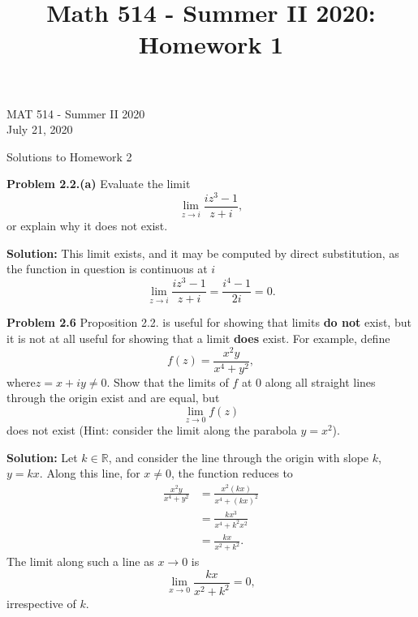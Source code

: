 \documentclass[12pt,oneside]{exam}
\title{Math 514 - Summer II 2020: Homework 1}
\newenvironment{exercise}[1]{\vspace{.1in}\noindent\textbf{Problem #1 \hspace{.05em}}}{}
\begin{document}
\begin{flushright}
\sc MAT 514 - Summer II 2020\\
July 21, 2020
\end{flushright}
\bigskip
 
\begin{center}
\textsf{Solutions to Homework 2} 
\end{center}


\begin{exercise}{2.2.(a)}
Evaluate the limit
\begin{equation*}
\lim_{z \to i} \frac{iz^3-1}{z+i},
\end{equation*}
or explain why it does not exist.
\end{exercise}

\vspace{0.5cm}

\noindent \textbf{Solution:} This limit exists, and it may be computed by direct substitution, as the function in question is continuous at $i$
\begin{equation*}
\lim_{z \to i} \frac{iz^3-1}{z+i} = \frac{i^4-1}{2i} = 0.
\end{equation*}

\vspace{1cm}

\begin{exercise}{2.6}
Proposition 2.2. is useful for showing that limits \textbf{do not} exist, but it is not at all useful for showing that a limit \textbf{does} exist. For example, define
\begin{equation*}
f(z) = \frac{x^2y}{x^4+y^2},
\end{equation*}
where$z=x+iy \neq 0$. Show that the limits of $f$ at $0$ along all straight lines through the origin exist and are equal, but
\begin{equation*}
\lim_{z\to 0} f(z)
\end{equation*}
does not exist (Hint: consider the limit along the parabola $y=x^2$).
\end{exercise}

\vspace{0.5cm}
\noindent \textbf{Solution:} Let $k \in \mathbb{R}$, and consider the line through the origin with slope $k$, $y=kx$. Along this line, for $x\neq 0$, the function reduces to 
\begin{align*}
\frac{x^2y}{x^4+y^2} & = \frac{x^2(kx)}{x^4+(kx)^2} \\
& = \frac{kx^3}{x^4+k^2x^2}\\
& = \frac{kx}{x^2+k^2}.
\end{align*}
The limit along such a line as $x\to 0$ is
\begin{equation*}
\lim_{x \to 0} \frac{kx}{x^2+k^2} = 0,
\end{equation*}
irrespective of $k$. 
\end{document}

